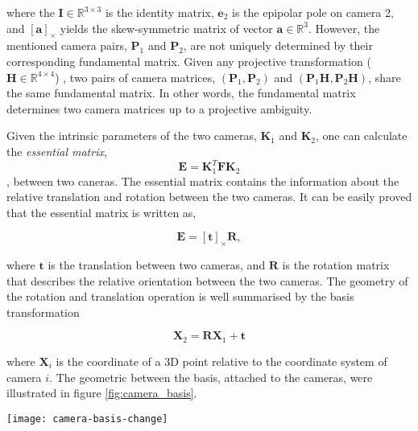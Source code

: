 \documentclass[11pt,twoside]{report}
\begin{document}
\noindent where the $\mathbf{I} \in \mathbb{R}^{3\times3}$ is the identity matrix, $\mathbf{e}_2$ is the epipolar pole on camera 2, and $[\mathbf{a}]_\times$ yields the skew-symmetric matrix of vector $\mathbf{a} \in \mathbb{R}^3$. However, the mentioned camera pairs, $\mathbf{P}_1$ and $\mathbf{P}_2$, are not uniquely determined by their corresponding fundamental matrix. Given any projective transformation ($\mathbf{H} \in \mathbb{R}^{4 \times 4}$) , two pairs of camera matrices, $(\mathbf{P}_1, \mathbf{P}_2)$ and $(\mathbf{P}_1 \mathbf{H}, \mathbf{P}_2 \mathbf{H})$, share the same fundamental matrix. In other words, the fundamental matrix determines two camera matrices up to a projective ambiguity.

Given the intrinsic parameters of the two cameras, $\mathbf{K}_1$ and $\mathbf{K}_2$, one can calculate the \emph{essential matrix}, $$\mathbf{E} = \mathbf{K}_1^T \mathbf{F} \mathbf{K}_2$$, between two caneras. The essential matrix contains the information about the relative translation and rotation between the two cameras. It can be easily proved that the essential matrix is written as,

$$
\mathbf{E} = [\mathbf{t}]_\times \mathbf{R},
$$

\noindent where $\mathbf{t}$ is the translation between two cameras, and $\mathbf{R}$ is the rotation matrix that describes the relative orientation between the two cameras. The geometry of the rotation and translation operation is well summarised by the basis transformation

$$
\mathbf{X}_2 = \mathbf{R} \mathbf{X}_1 + \mathbf{t}
$$

\noindent where $\mathbf{X}_i$ is the coordinate of a 3D point relative to the coordinate system of camera $i$. The geometric between the basis, attached to the cameras, were illustrated in figure \ref{fig:camera_basis}.

\begin{SCfigure}
  \texttt{[image: camera-basis-change]}
  \caption{The relative orientation and translation between two cameras. The coordinate of the centre of camera 2, expressed in the basis attached to camera 1, is $-\mathbf{R}^T\mathbf{t}$. Notice the same point has the coordinate of $\mathbf{0}$ in the basis attached to camera 2.}
  \label{fig:camera_basis}
\end{SCfigure}
\end{document}
